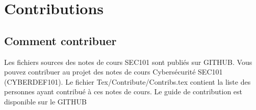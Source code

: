 
\section{Contributions}

\subsection{Comment contribuer}

Les fichiers sources des notes de cours  SEC101 sont publiés sur GITHUB. Vous pouvez contribuer au projet des notes de cours Cybersécurité SEC101 (CYBERDEF101). Le fichier Tex/Contribute/Contribs.tex contient la liste des personnes ayant contribué à ces notes de cours.
Le guide de contribution est disponible sur le GITHUB

